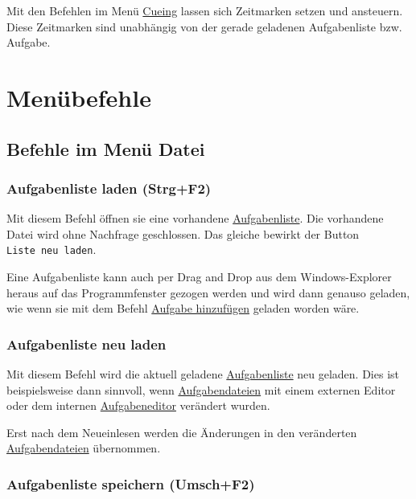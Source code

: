 \documentclass[a4paper,DIV=11
]{scrartcl}
\begin{document}
Mit den Befehlen im Menü \protect\hyperlink{BefehleImMenuCueing}{Cueing}
lassen sich Zeitmarken setzen und ansteuern. Diese Zeitmarken sind
unabhängig von der gerade geladenen Aufgabenliste bzw. Aufgabe.

\hypertarget{menuxfcbefehle}{%
\section{Menübefehle}\label{menuxfcbefehle}}

\hypertarget{befehle-im-menuxfc-datei}{%
\subsection{Befehle im Menü Datei}\label{befehle-im-menuxfc-datei}}

\hypertarget{aufgabenliste-laden-strgf2}{%
\subsubsection{Aufgabenliste laden
(Strg+F2)}\label{aufgabenliste-laden-strgf2}}

Mit diesem Befehl öffnen sie eine vorhandene
\protect\hyperlink{aufgabenlisten}{Aufgabenliste}. Die vorhandene Datei
wird ohne Nachfrage geschlossen. Das gleiche bewirkt der Button \texttt{Liste\ neu\ laden}.

Eine Aufgabenliste kann auch per Drag and Drop aus dem Windows-Explorer
heraus auf das Programmfenster gezogen werden und wird dann genauso
geladen, wie wenn sie mit dem Befehl
\protect\hyperlink{AufgabeHinzufuegen}{Aufgabe hinzufügen} geladen
worden wäre.

\hypertarget{aufgabenliste-neu-laden}{%
\subsubsection{Aufgabenliste neu laden}\label{aufgabenliste-neu-laden}}

Mit diesem Befehl wird die aktuell geladene
\protect\hyperlink{aufgabenlisten}{Aufgabenliste} neu geladen. Dies ist
beispielsweise dann sinnvoll, wenn
\protect\hyperlink{aufgabendateien}{Aufgabendateien} mit einem externen
Editor oder dem internen
\protect\hyperlink{BefehleImMenuAufgabeneditor}{Aufgabeneditor}
verändert wurden.

Erst nach dem Neueinlesen werden die Änderungen in den veränderten
\protect\hyperlink{aufgabendateien}{Aufgabendateien} übernommen.

\hypertarget{aufgabenliste-speichern-umschf2}{%
\subsubsection{Aufgabenliste speichern
(Umsch+F2)}\label{aufgabenliste-speichern-umschf2}}
\end{document}

